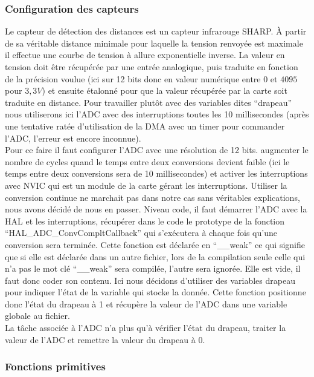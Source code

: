 \documentclass{article}
\begin{document}
\subsubsection{Configuration des capteurs}

Le capteur de détection des distances est un capteur infrarouge SHARP. À partir de sa véritable distance minimale pour laquelle la tension renvoyée est maximale il effectue une courbe de tension à allure exponentielle inverse. La valeur en tension doit être récupérée par une entrée analogique, puis traduite en fonction de la précision voulue (ici sur 12 bits donc en valeur numérique entre $0$ et $4095$ pour $3,3V$) et ensuite étalonné pour que la valeur récupérée par la carte soit traduite en distance. Pour travailler plutôt avec des variables dites ``drapeau'' nous utiliserons ici l'ADC avec des interruptions toutes les 10 millisecondes (après une tentative ratée d'utilisation de la DMA avec un timer pour commander l'ADC, l'erreur est encore inconnue).\\

Pour ce faire il faut configurer l'ADC avec une résolution de 12 bits. augmenter le nombre de cycles quand le temps entre deux conversions devient faible (ici le temps entre deux conversions sera de 10 millisecondes) et activer les interruptions avec NVIC qui est un module de la carte gérant les interruptions. Utiliser la conversion continue ne marchait pas dans notre cas sans véritables explications, nous avons décidé de nous en passer. Niveau code, il faut démarrer l'ADC avec la HAL et les interruptions, récupérer dans le code le prototype de la fonction ``HAL\_ADC\_ConvCompltCallback'' qui s’exécutera à chaque fois qu'une conversion sera terminée. Cette fonction est déclarée en ``\_\_weak'' ce qui signifie que si elle est déclarée dans un autre fichier, lors de la compilation seule celle qui n'a pas le mot clé ``\_\_weak'' sera compilée, l'autre sera ignorée. Elle est vide, il faut donc coder son contenu. Ici nous décidons d'utiliser des variables drapeau pour indiquer l'état de la variable qui stocke la donnée. Cette fonction positionne donc l'état du drapeau à 1 et récupère la valeur de l'ADC dans une variable globale au fichier. \\

La tâche associée à l'ADC n'a plus qu'à vérifier l'état du drapeau, traiter la valeur de l'ADC et remettre la valeur du drapeau à 0.

\subsubsection{Fonctions primitives}
\end{document}
